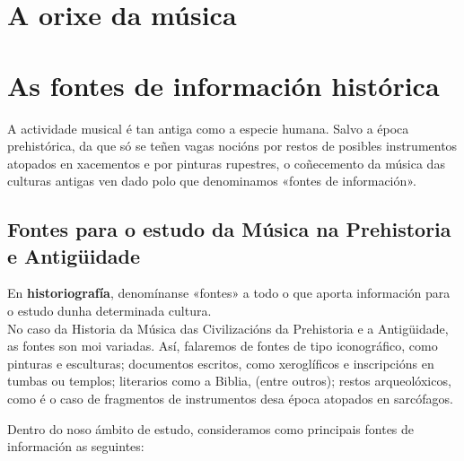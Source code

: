 \documentclass[a4paper, twoside]{templates/ociamthesis}
\begin{document}
\hypertarget{a-orixe-da-muxfasica}{%
\section{A orixe da música}\label{a-orixe-da-muxfasica}}

\hypertarget{as-fontes-de-informaciuxf3n-histuxf3rica-1}{%
\section*{As fontes de información histórica}\label{as-fontes-de-informaciuxf3n-histuxf3rica-1}}

A actividade musical é tan antiga como a especie humana. Salvo a época prehistórica, da que só se teñen vagas nocións por restos de posibles instrumentos atopados en xacementos e por pinturas rupestres, o coñecemento da música das culturas antigas ven dado polo que denominamos «fontes de información».

\hypertarget{fontes-para-o-estudo-da-muxfasica-na-prehistoria-e-antiguxfcidade-1}{%
\subsection*{Fontes para o estudo da Música na Prehistoria e Antigüidade}\label{fontes-para-o-estudo-da-muxfasica-na-prehistoria-e-antiguxfcidade-1}}

En \textbf{historiografía}, denomínanse «fontes» a todo o que aporta información para o estudo dunha determinada cultura.\\
No caso da Historia da Música das Civilizacións da Prehistoria e a Antigüidade, as fontes son moi variadas. Así, falaremos de fontes de tipo iconográfico, como pinturas e esculturas; documentos escritos, como xeroglíficos e inscripcións en tumbas ou templos; literarios como a Biblia, (entre outros); restos arqueolóxicos, como é o caso de fragmentos de instrumentos desa época atopados en sarcófagos.

Dentro do noso ámbito de estudo, consideramos como principais fontes de información as seguintes:
\end{document}
